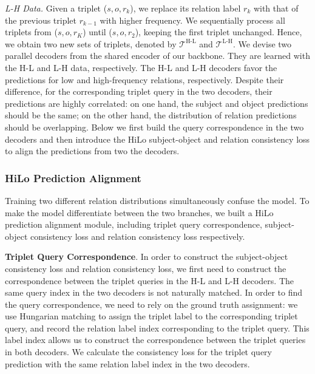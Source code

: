 \emph{L-H Data.}
Given a triplet ($s, o, r_k$), we replace its relation label $r_k$ with that of the previous triplet $r_{k-1}$ with higher frequency. 
 We sequentially process all triplets from ($s, o, r_K$) until ($s, o, r_2$), keeping the first triplet unchanged.
%
Hence, we obtain two new sets of triplets, denoted by $\mathcal T^\text{H-L}$ and $\mathcal T^\text{L-H}$.  We devise two parallel decoders from the shared encoder of our backbone. They are learned with the H-L and L-H data, respectively.
%
The H-L and L-H decoders favor the predictions for low and high-frequency relations, respectively. Despite their difference, for the corresponding triplet query in the two decoders, their predictions are highly correlated: on one hand, the subject and object predictions should be the same; on the other hand, the distribution of relation predictions should be overlapping.  Below we first build the query correspondence in the two decoders and then introduce the HiLo subject-object and relation consistency loss to align the predictions from two the decoders. 

\subsubsection{HiLo Prediction Alignment}
\label{hilo:sec:framework:prediction_alignment}
Training two different relation distributions simultaneously confuse the model.
To make the model differentiate between the two branches, we built a HiLo prediction alignment module, including triplet query correspondence, subject-object consistency loss and relation consistency loss respectively.

\noindent \textbf{Triplet Query Correspondence}.
In order to construct the subject-object consistency loss and relation consistency loss, we first need to construct the correspondence between the triplet queries in the H-L and L-H decoders.
%
The same query index in the two decoders is not naturally matched.  In order to find the query correspondence, we need to rely on the ground truth assignment: we use Hungarian matching to assign the triplet label to the corresponding triplet query, and record the relation label index corresponding to the triplet query.
This label index allows us to construct the correspondence between the triplet queries in both decoders.
%
We calculate the consistency loss for the triplet query prediction with the same relation label index in the two decoders.

